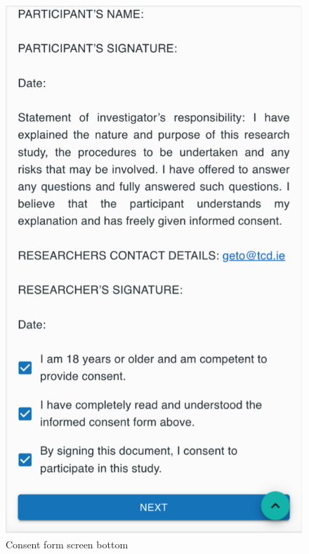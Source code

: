 \begin{minipage}{.5\textwidth}
\begin{figure}[H]
    \centering
    \includegraphics[width=\textwidth]{appendix/imgs/web-inform-bottom.png}
    \caption{Consent form screen bottom}
    \label{fig:web-inform-bottom}
\end{figure}
\end{minipage}
